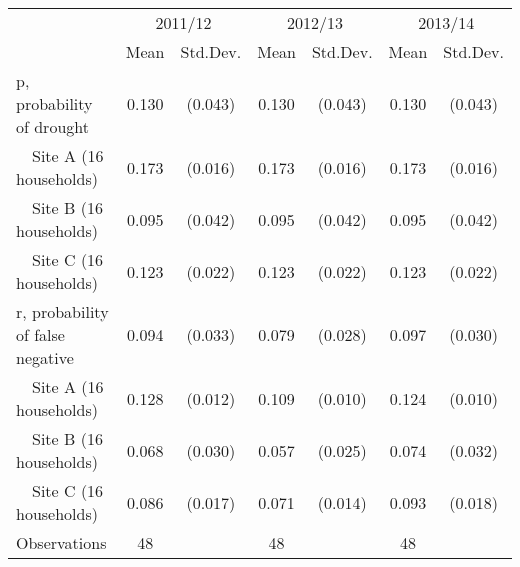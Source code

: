 {
\def\sym#1{\ifmmode^{#1}\else\(^{#1}\)\fi}
\begin{tabular}{l*{3}{cc}}
\hline\hline
                    &\multicolumn{2}{c}{2011/12}&\multicolumn{2}{c}{2012/13}&\multicolumn{2}{c}{2013/14}\\\cmidrule(lr){2-3}\cmidrule(lr){4-5}\cmidrule(lr){6-7}
                    &        Mean&    Std.Dev.&        Mean&    Std.Dev.&        Mean&    Std.Dev.\\
\hline
p, probability of drought&       0.130&     (0.043)&       0.130&     (0.043)&       0.130&     (0.043)\\
~~Site A (16 households)&       0.173&     (0.016)&       0.173&     (0.016)&       0.173&     (0.016)\\
~~Site B (16 households)&       0.095&     (0.042)&       0.095&     (0.042)&       0.095&     (0.042)\\
~~Site C (16 households)&       0.123&     (0.022)&       0.123&     (0.022)&       0.123&     (0.022)\\
r, probability of false negative&       0.094&     (0.033)&       0.079&     (0.028)&       0.097&     (0.030)\\
~~Site A (16 households)&       0.128&     (0.012)&       0.109&     (0.010)&       0.124&     (0.010)\\
~~Site B (16 households)&       0.068&     (0.030)&       0.057&     (0.025)&       0.074&     (0.032)\\
~~Site C (16 households)&       0.086&     (0.017)&       0.071&     (0.014)&       0.093&     (0.018)\\
\hline
Observations        &          48&            &          48&            &          48&            \\
\hline\hline
\end{tabular}
}
